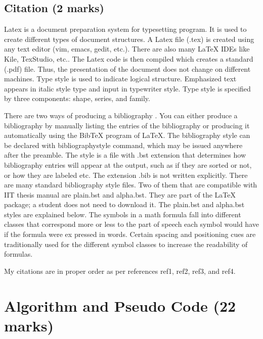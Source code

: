 \documentclass[english,12pt]{article}
\begin{document}
\subsection{Citation (2 marks)}
Latex \cite{ref1} is a document preparation system for typesetting program. It is used
to create different types of document structures. A Latex file (.tex) is created
using any text editor (vim, emacs, gedit, etc.). There are also many LaTeX
IDEs like Kile, TexStudio, etc.. The Latex code is then compiled which creates
a standard (.pdf) file. Thus, the presentation of the document does not change
on different machines.\newline
Type style \cite{ref2} is used to indicate logical structure. Emphasized text appears in
italic style type and input in typewriter style. Type style is specified by three
components: shape, series, and family.\\ \par
There are two ways of producing a bibliography \cite{ref3}. You can either produce
a bibliography by manually listing the entries of the bibliography or producing
it automatically using the BibTeX program of LaTeX. The bibliography style can
be declared with bibliographystyle command, which may be issued anywhere
after the preamble. The style is a file with .bst extension that determines how
bibliography entries will appear at the output, such as if they are sorted or not,
or how they are labeled etc. The extension .bib is not written explicitly. There
are many standard bibliography style files. Two of them that are compatible
with IIT thesis manual are plain.bst and alpha.bst. They are part of the LaTeX
package; a student does not need to download it. The plain.bst and alpha.bst
styles are explained below. The symbols in a math formula fall into different
classes that correspond more or less to the part of speech each symbol would
have if the formula were ex pressed in words. Certain spacing and positioning cues are traditionally used for the different symbol classes to increase the
readability of formulas.\cite{ref4} \par
My citations are in proper order as per references ref1, ref2, ref3, and ref4.
\newpage
\section{Algorithm and Pseudo Code (22 marks)}
\end{document}
